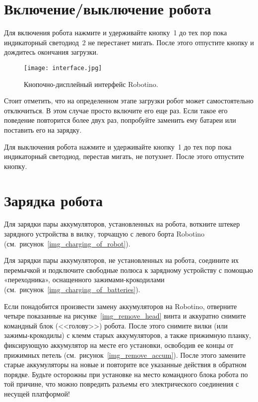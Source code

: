 \section{Включение/выключение робота}
Для включения робота нажмите и удерживайте кнопку~1 до тех пор пока индикаторный светодиод~2 не перестанет мигать.
После этого отпустите кнопку и дождитесь окончания загрузки.

\begin{figure}[h]
	\centering
	\texttt{[image: interface.jpg]}
	\caption{Кнопочно-дисплейный интерфейс Robotino.}
	\label{img_interface}
\end{figure}

Стоит отметить, что на определенном этапе загрузки робот может самостоятельно отключиться.
В этом случае просто включите его еще раз.
Если такое его поведение повторится более двух раз, попробуйте заменить ему батареи или поставить его на зарядку.

Для выключения робота нажмите и удерживайте кнопку~1 до тех пор пока индикаторный светодиод, перестав мигать, не потухнет.
После этого отпустите кнопку.



\newpage
\section{Зарядка робота}\label{part_charging}
Для зарядки пары аккумуляторов, установленных на робота, воткните штекер зарядного устройства в вилку, торчащую с левого борта Robotino (см.~рисунок~\ref{img_charging_of_robot}).

Для зарядки пары аккумуляторов, не установленных на робота, соедините их перемычкой и подключите свободные полюса к зарядному устройству с помощью «переходника», оснащенного зажимами-крокодилами (см.~рисунок~\ref{img_charging_of_batteries}).

Если понадобится произвести замену аккумуляторов на Robotino, отверните четыре показанные на рисунке~\ref{img_remove_head} винта и аккуратно снимите командный блок (<<голову>>) робота.
После этого снимите вилки (или зажимы-крокодилы) с клемм старых аккумуляторов, а также прижимную планку, фиксирующую аккумулятор на месте его установки, освободив ее концы от прижимных петель (см.~рисунок~\ref{img_remove_accum}).
После этого замените старые аккумуляторы на новые и повторите все указанные действия в обратном порядке.
Будьте осторожны при установке на место командного блока робота по той причине, что можно повредить разъемы его электрического соединения с несущей платформой!

